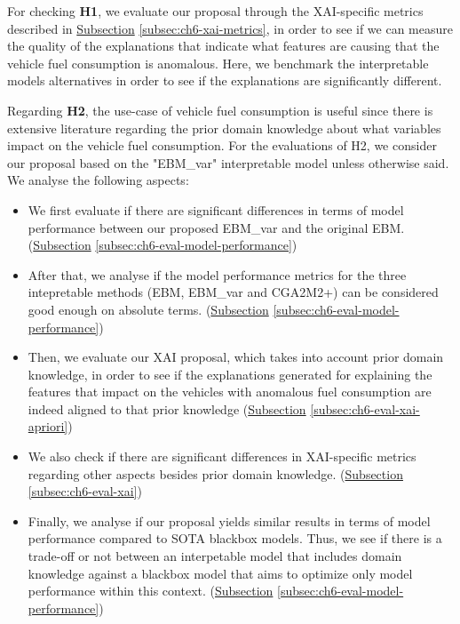 For checking \textbf{H1}, we evaluate our proposal through the XAI-specific metrics described in \hyperref[subsec:ch6-xai-metrics]{Subsection} \ref{subsec:ch6-xai-metrics}, in order to see if we can measure the quality of the explanations that indicate what features are causing that the vehicle fuel consumption is anomalous. Here, we benchmark the interpretable models alternatives in order to see if the explanations are significantly different.

Regarding \textbf{H2}, the use-case of vehicle fuel consumption is useful since there is extensive literature regarding the prior domain knowledge about what variables impact on the vehicle fuel consumption. For the evaluations of H2, we consider our proposal based on the "EBM\_var" interpretable model unless otherwise said. We analyse the following aspects:
\begin{itemize}
\item We first evaluate if there are significant differences in terms of model performance between our proposed EBM\_var and the original EBM. (\hyperref[subsec:ch6-eval-model-performance]{Subsection} \ref{subsec:ch6-eval-model-performance})
\item After that, we analyse if the model performance metrics for the three intepretable methods (EBM, EBM\_var and CGA2M2+) can be considered good enough on absolute terms. (\hyperref[subsec:ch6-eval-model-performance]{Subsection} \ref{subsec:ch6-eval-model-performance})
\item Then, we evaluate our XAI proposal, which takes into account prior domain knowledge, in order to see if the explanations generated for explaining the features that impact on the vehicles with anomalous fuel consumption are indeed aligned to that prior knowledge (\hyperref[subsec:ch6-eval-xai-apriori]{Subsection} \ref{subsec:ch6-eval-xai-apriori})
\item We also check if there are significant differences in XAI-specific metrics regarding other aspects besides prior domain knowledge. (\hyperref[subsec:ch6-eval-xai]{Subsection} \ref{subsec:ch6-eval-xai})
\item Finally, we analyse if our proposal yields similar results in terms of model performance compared to SOTA blackbox models. Thus, we see if there is a trade-off or not between an interpetable model that includes domain knowledge against a blackbox model that aims to optimize only model performance within this context. (\hyperref[subsec:ch6-eval-model-performance]{Subsection} \ref{subsec:ch6-eval-model-performance})
\end{itemize}

